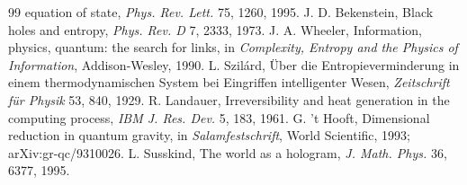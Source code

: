 \documentclass[10pt,twocolumn]{article}
\begin{document}
\begin{thebibliography}{99}
equation of state, \textit{Phys. Rev. Lett.} 75, 1260, 1995.
 J. D. Bekenstein, Black holes and entropy,
\textit{Phys. Rev. D} 7, 2333, 1973.
 J. A. Wheeler, Information, physics, quantum: the search
for links, in \textit{Complexity, Entropy and the Physics of Information},
Addison-Wesley, 1990.
 L. Szil\'ard, \"Uber die Entropieverminderung in einem
thermodynamischen System bei Eingriffen intelligenter Wesen, \textit{Zeitschrift
f\"ur Physik} 53, 840, 1929.
 R. Landauer, Irreversibility and heat generation in the
computing process, \textit{IBM J. Res. Dev.} 5, 183, 1961.
 G. 't Hooft, Dimensional reduction in quantum gravity, in
\textit{Salamfestschrift}, World Scientific, 1993; arXiv:gr-qc/9310026.
 L. Susskind, The world as a hologram, \textit{J. Math.
Phys.} 36, 6377, 1995.
\end{thebibliography}
\label{sec:refs}
\end{document}
